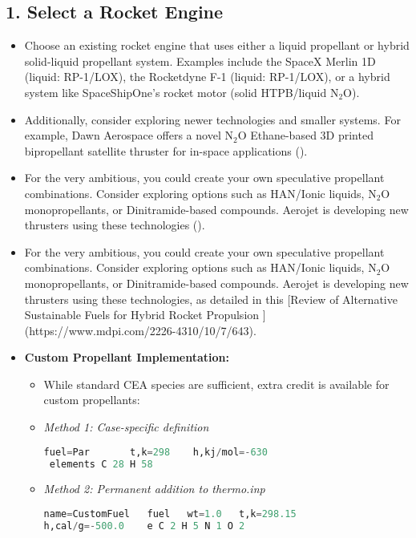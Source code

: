 \documentclass[12pt]{article}
\begin{document}
\subsection{1. Select a Rocket Engine}
\begin{itemize}
    \item Choose an existing rocket engine that uses either a liquid propellant or hybrid solid-liquid propellant system. Examples include the SpaceX Merlin 1D (liquid: RP-1/LOX), the Rocketdyne F-1 (liquid: RP-1/LOX), or a hybrid system like SpaceShipOne's rocket motor (solid HTPB/liquid N$_2$O).
    \item Additionally, consider exploring newer technologies and smaller systems. For example, Dawn Aerospace offers a novel N$_2$O Ethane-based 3D printed bipropellant satellite thruster for in-space applications (\cite{dawn_aero}).
    \item For the very ambitious, you could create your own speculative propellant combinations. Consider exploring options such as HAN/Ionic liquids, N$_2$O monopropellants, or Dinitramide-based compounds. Aerojet is developing new thrusters using these technologies (\cite{aerojet_report}).
    \item For the very ambitious, you could create your own speculative propellant combinations. Consider exploring options such as HAN/Ionic liquids, N$_2$O monopropellants, or Dinitramide-based compounds. Aerojet is developing new thrusters using these technologies, as detailed in this [Review of Alternative Sustainable Fuels for Hybrid Rocket Propulsion
    ](https://www.mdpi.com/2226-4310/10/7/643). 
    
    \item \textbf{Custom Propellant Implementation:}
    \begin{itemize}
        \item While standard CEA species are sufficient, extra credit is available for custom propellants:
        
        \item \textit{Method 1: Case-specific definition}
        \begin{lstlisting}[language=Python,basicstyle=\small\ttfamily,frame=single]
fuel=Par       t,k=298    h,kj/mol=-630
 elements C 28 H 58
        \end{lstlisting}

        \item \textit{Method 2: Permanent addition to thermo.inp}
        \begin{lstlisting}[language=Python,basicstyle=\small\ttfamily,frame=single]
name=CustomFuel   fuel   wt=1.0   t,k=298.15
h,cal/g=-500.0    e C 2 H 5 N 1 O 2
        \end{lstlisting}


\end{itemize}
\end{itemize}
\end{document}
